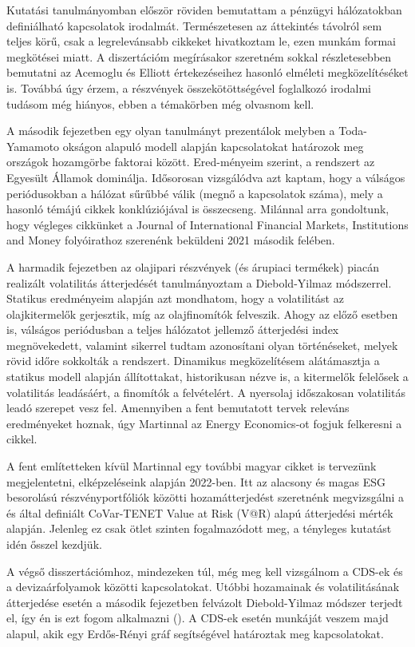 \documentclass[12pt,bibliography=totoc]{article}
\begin{document}
Kutatási tanulmányomban először röviden bemutattam a pénzügyi hálózatokban definiálható kapcsolatok irodalmát. Természetesen az áttekintés távolról sem teljes körű, csak a legrelevánsabb cikkeket hivatkoztam le, ezen munkám formai megkötései miatt. A diszertációm megírásakor szeretném sokkal részletesebben bemutatni az Acemoglu és Elliott értekezéseihez hasonló elméleti megközelítéséket is. Továbbá úgy érzem, a részvények összekötöttségével foglalkozó irodalmi tudásom még hiányos, ebben a témakörben még olvasnom kell.

A második fejezetben egy olyan tanulmányt prezentálok melyben a Toda-Yamamoto okságon alapuló modell alapján kapcsolatokat határozok meg országok hozamgörbe faktorai között. Ered-ményeim szerint, a rendszert az Egyesült Államok dominálja. Idősorosan vizsgálódva azt kaptam, hogy a válságos periódusokban a hálózat sűrűbbé válik (megnő a kapcsolatok száma), mely a hasonló témájú cikkek konklúziójával is összecseng. Milánnal arra gondoltunk, hogy végleges cikkünket a Journal of International Financial Markets, Institutions and Money folyóirathoz szerenénk beküldeni 2021 második felében.

A harmadik fejezetben az olajipari részvények (és árupiaci termékek) piacán realizált volatilitás átterjedését tanulmányoztam a Diebold-Yilmaz módszerrel. Statikus eredményeim alapján azt mondhatom, hogy a volatilitást az olajkitermelők gerjesztik, míg az olajfinomítók felveszik. Ahogy az előző esetben is, válságos periódusban a teljes hálózatot jellemző átterjedési index megnövekedett, valamint sikerrel tudtam azonosítani olyan történéseket, melyek rövid időre sokkolták a rendszert. Dinamikus megközelítésem alátámasztja a statikus modell alapján állítottakat, historikusan nézve is, a kitermelők felelősek a volatilitás leadásáért, a finomítók a felvételért. A nyersolaj időszakosan volatilitás leadó szerepet vesz fel. Amennyiben a fent bemutatott tervek releváns eredményeket hoznak, úgy Martinnal az Energy Economics-ot fogjuk felkeresni a cikkel.

A fent említetteken kívül Martinnal egy további magyar cikket is tervezünk megjelentetni, elképzeléseink alapján 2022-ben. Itt az alacsony és magas ESG besorolású részvényportfóliók közötti hozamátterjedést szeretnénk megvizsgálni a \cite{adrian2008federal} és \cite{hardle2016tenet} által definiált CoVar-TENET Value at Risk (V@R) alapú átterjedési mérték alapján. Jelenleg ez csak ötlet szinten fogalmazódott meg, a tényleges kutatást idén ősszel kezdjük. 

A végső disszertációmhoz, mindezeken túl, még meg kell vizsgálnom a CDS-ek és a devizaárfolyamok közötti kapcsolatokat. Utóbbi hozamainak és volatilitásának átterjedése esetén a második fejezetben felvázolt Diebold-Yilmaz módszer terjedt el, így én is ezt fogom alkalmazni (\cite{greenwood2016risk}). A CDS-ek esetén \cite{markose2012too} munkáját veszem majd alapul, akik egy Erdős-Rényi gráf segítségével határoztak meg kapcsolatokat.
\end{document}
